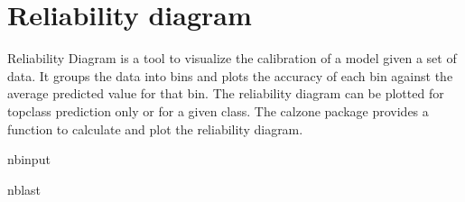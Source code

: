 \documentclass[letterpaper,10pt,english]{sphinxmanual}
\begin{document}
\sphinxstepscope


\chapter{Reliability diagram}
\label{\detokenize{notebooks/reliability_diagram:Reliability-diagram}}\label{\detokenize{notebooks/reliability_diagram::doc}}
\sphinxAtStartPar
Reliability Diagram is a tool to visualize the calibration of a model given a set of data. It groups the data into bins and plots the accuracy of each bin against the average predicted value for that bin. The reliability diagram can be plotted for top\sphinxhyphen{}class prediction only or for a given class. The calzone package provides a function to calculate and plot the reliability diagram.

\begin{sphinxuseclass}{nbinput}
\begin{sphinxuseclass}{nblast}
{
\begin{sphinxVerbatim}[commandchars=\\\{\}]
\llap{\color{nbsphinxin}[1]:\,\hspace{\fboxrule}\hspace{\fboxsep}}
   
   
   
  
\end{sphinxVerbatim}
}

\end{sphinxuseclass}
\end{sphinxuseclass}
\end{document}
